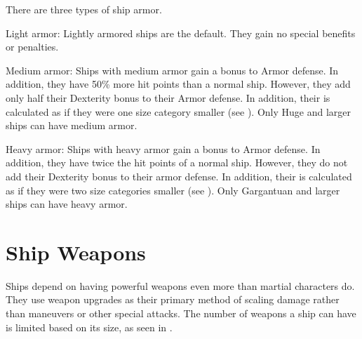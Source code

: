   There are three types of ship armor.
  \begin{raggeditemize}
    \item Light armor: Lightly armored ships are the default. They gain no special benefits or penalties.
    \item Medium armor: Ships with medium armor gain a  bonus to Armor defense.
      In addition, they have 50\% more hit points than a normal ship.
      However, they add only half their Dexterity bonus to their Armor defense.
      In addition, their  is calculated as if they were one size category smaller (see ).
      Only Huge and larger ships can have medium armor.
    \item Heavy armor: Ships with heavy armor gain a  bonus to Armor defense.
      In addition, they have twice the hit points of a normal ship.
      However, they do not add their Dexterity bonus to their armor defense.
      In addition, their  is calculated as if they were two size categories smaller (see ).
      Only Gargantuan and larger ships can have heavy armor.
  \end{raggeditemize}


\section{Ship Weapons}\label{Ship Weapons}
  Ships depend on having powerful weapons even more than martial characters do.
  They use weapon upgrades as their primary method of scaling damage rather than maneuvers or other special attacks.
  The number of weapons a ship can have is limited based on its size, as seen in .

